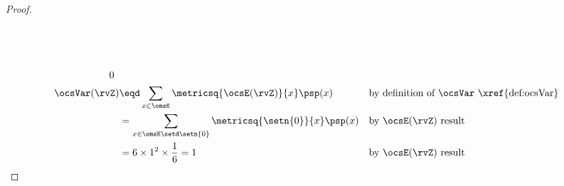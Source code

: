 \begin{tabstr}{0.75}
\begin{proof}
\begin{align*}
{{\begin{array}{c}
              \mbox{ }\\
              \mbox{ }\\
              \mbox{ }\\
              \mbox{ }\\
              0 
           \end{array}}}
   \\
    \ocsVar(\rvZ)
      &\eqd \sum_{x\in\omsK}\metricsq{\ocsE(\rvZ)}{x}\psp(x)
      && \text{by definition of $\ocsVar$ \xref{def:ocsVar}}
    \\&= \sum_{x\in\omsK\setd\setn{0}}\metricsq{\setn{0}}{x}\psp(x)
      && \text{by $\ocsE(\rvZ)$ result}
    \\&= 6\times1^2\times\frac{1}{6} = 1
      && \text{by $\ocsE(\rvZ)$ result}
  \end{align*}
\end{proof}




\end{tabstr}
